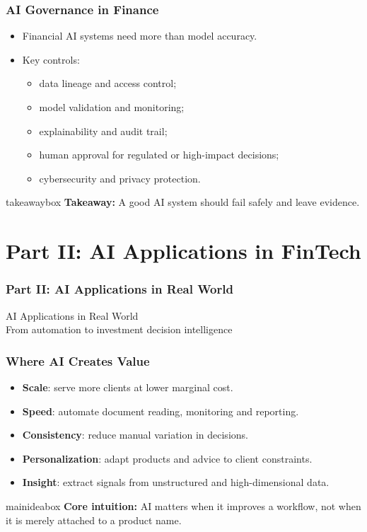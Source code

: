 \documentclass[aspectratio=169,12pt]{beamer}
\newcommand{\currentframetitle}{}
\newcommand{\slideTitle}[1]{\gdef\currentframetitle{#1}\frametitle{#1}}
\newcommand{\keyterm}[1]{\textbf{#1}}
\newcommand{\mainidea}[1]{%
  \vspace{0.08cm}
  \begin{beamercolorbox}[wd=\linewidth,rounded=true,sep=0.18cm]{mainideabox}
    \small\textbf{Core intuition:} #1
  \end{beamercolorbox}%
}
\newcommand{\takeaway}[1]{%
  \vspace{0.08cm}
  \begin{beamercolorbox}[wd=\linewidth,rounded=true,sep=0.18cm]{takeawaybox}
    \small\textbf{Takeaway:} #1
  \end{beamercolorbox}%
}
\begin{document}
\begin{frame}
\slideTitle{AI Governance in Finance}
\begin{itemize}
  \item Financial AI systems need more than model accuracy.
  \item Key controls:
  \begin{itemize}
    \item data lineage and access control;
    \item model validation and monitoring;
    \item explainability and audit trail;
    \item human approval for regulated or high-impact decisions;
    \item cybersecurity and privacy protection.
  \end{itemize}
\end{itemize}
\takeaway{A good AI system should fail safely and leave evidence.}
\end{frame}

\section{Part II: AI Applications in FinTech}

\begin{frame}
\slideTitle{Part II: AI Applications in Real World}
\vspace{1.0cm}
\begin{center}
{\Huge AI Applications in Real World}\\[0.35cm]
{\Large From automation to investment decision intelligence}
\end{center}
\end{frame}

\begin{frame}
\slideTitle{Where AI Creates Value}
\begin{itemize}
  \item \keyterm{Scale}: serve more clients at lower marginal cost.
  \item \keyterm{Speed}: automate document reading, monitoring and reporting.
  \item \keyterm{Consistency}: reduce manual variation in decisions.
  \item \keyterm{Personalization}: adapt products and advice to client constraints.
  \item \keyterm{Insight}: extract signals from unstructured and high-dimensional data.
\end{itemize}
\mainidea{AI matters when it improves a workflow, not when it is merely attached to a product name.}
\end{frame}
\end{document}
